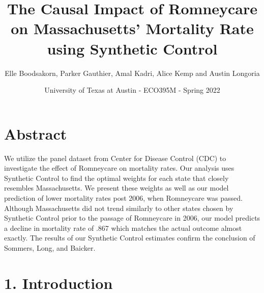 \documentclass[
]{article}
\title{The Causal Impact of Romneycare on Massachusetts' Mortality Rate
using Synthetic Control}
\author{Elle Boodsakorn, Parker Gauthier, Amal Kadri, Alice Kemp and
Austin Longoria}
\date{University of Texas at Austin - ECO395M - Spring 2022}
\begin{document}
\maketitle

\newline
\newline

\hypertarget{abstract}{%
\section{Abstract}\label{abstract}}

We utilize the panel dataset from Center for Disease Control (CDC) to
investigate the effect of Romneycare on mortality rates. Our analysis
uses Synthetic Control to find the optimal weights for each state that
closely resembles Massachusetts. We present these weights as well as our
model prediction of lower mortality rates post 2006, when Romneycare was
passed. Although Massachusetts did not trend similarly to other states
chosen by Synthetic Control prior to the passage of Romneycare in 2006,
our model predicts a decline in mortality rate of .867 which matches the
actual outcome almost exactly. The results of our Synthetic Control
estimates confirm the conclusion of Sommers, Long, and Baicker. \newpage

\hypertarget{introduction}{%
\section{1. Introduction}\label{introduction}}
\end{document}

